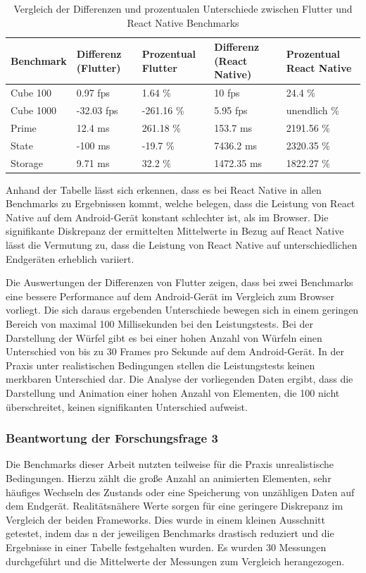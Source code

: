 \begin{table}[h!]
    \centering
    \begin{tabular}{|l|p{3cm}|p{3cm}|p{3cm}|p{3cm}|}
    \hline
    \textbf{Benchmark} & \textbf{Differenz (Flutter)} & \textbf{Prozentual Flutter} & \textbf{Differenz (React Native)} & \textbf{Prozentual React Native} \\
    \hline
    Cube 100   & 0.97 fps & 1.64 \% & 10 fps & 24.4 \% \\
    Cube 1000  & -32.03 fps & -261.16 \% & 5.95 fps & unendlich \% \\
    Prime      & 12.4 ms & 261.18 \% & 153.7 ms & 2191.56 \% \\
    State      & -100 ms & -19.7 \% & 7436.2 ms & 2320.35 \% \\
    Storage    & 9.71 ms & 32.2 \% & 1472.35 ms & 1822.27 \% \\
    \hline
    \end{tabular}
    \caption{Vergleich der Differenzen und prozentualen Unterschiede zwischen Flutter und React Native Benchmarks}
\end{table}


Anhand der Tabelle lässt sich erkennen, dass es bei React Native in allen Benchmarks zu Ergebnissen kommt, welche belegen, dass die Leistung von React Native auf dem Android-Gerät konstant schlechter ist, als im Browser. Die signifikante Diskrepanz der ermittelten Mittelwerte in Bezug auf React Native lässt die Vermutung zu, dass die Leistung von React Native auf unterschiedlichen Endgeräten erheblich variiert.

Die Auswertungen der Differenzen von Flutter zeigen, dass bei zwei Benchmarks eine bessere Performance auf dem Android-Gerät im Vergleich zum Browser vorliegt. Die sich daraus ergebenden Unterschiede bewegen sich in einem geringen Bereich von maximal 100 Millisekunden bei den Leistungstests. Bei der Darstellung der Würfel gibt es bei einer hohen Anzahl von Würfeln einen Unterschied von bis zu 30 Frames pro Sekunde auf dem Android-Gerät. In der Praxis unter realistischen Bedingungen stellen die Leistungstests keinen merkbaren Unterschied dar. Die Analyse der vorliegenden Daten ergibt, dass die Darstellung und Animation einer hohen Anzahl von Elementen, die 100 nicht überschreitet, keinen signifikanten Unterschied aufweist.

\subsubsection{Beantwortung der Forschungsfrage 3}
Die Benchmarks dieser Arbeit nutzten teilweise für die Praxis unrealistische Bedingungen. Hierzu zählt die große Anzahl an animierten Elementen, sehr häufiges Wechseln des Zustands oder eine Speicherung von unzähligen Daten auf dem Endgerät. Realitätsnähere Werte sorgen für eine geringere Diskrepanz im Vergleich der beiden Frameworks. Dies wurde in einem kleinen Ausschnitt getestet, indem das n der jeweiligen Benchmarks drastisch reduziert und die Ergebnisse in einer Tabelle festgehalten wurden. Es wurden 30 Messungen durchgeführt und die Mittelwerte der Messungen zum Vergleich herangezogen.

